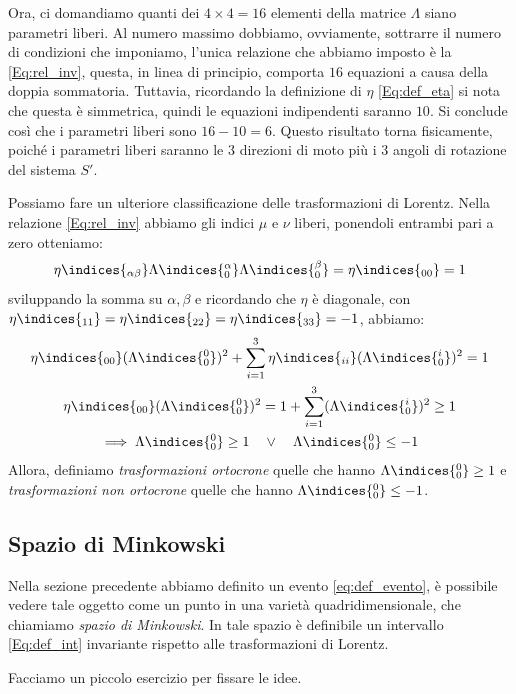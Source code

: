 Ora, ci domandiamo quanti dei $4\times4=16$ elementi della matrice $\Lambda$ siano parametri liberi. Al numero massimo dobbiamo, ovviamente, sottrarre il numero di condizioni che imponiamo, l'unica relazione che abbiamo imposto è la \eqref{Eq:rel_inv}, questa, in linea di principio, comporta $16$ equazioni a causa della doppia sommatoria. Tuttavia, ricordando la definizione di $\eta$ \eqref{Eq:def_eta} si nota che questa è simmetrica, quindi le equazioni indipendenti saranno $10$.
Si conclude così che i parametri liberi sono $16-10=6$. Questo risultato torna fisicamente, poiché i parametri liberi saranno le $3$ direzioni di moto più i $3$ angoli di rotazione del sistema $S'$.

Possiamo fare un ulteriore classificazione delle trasformazioni di Lorentz. Nella relazione \eqref{Eq:rel_inv} abbiamo gli indici $\mu$ e $\nu$ liberi, ponendoli entrambi pari a zero otteniamo:
\begin{equation*}
\eta\indices{_{\alpha \beta}}\Lambda\indices{^\alpha_0}\Lambda\indices{^\beta_0}=\eta\indices{_{00}}=1
\end{equation*}
sviluppando la somma su $\alpha,\beta$ e ricordando che $\eta$ è diagonale, con $\eta\indices{_{11}}=\eta\indices{_{22}}=\eta\indices{_{33}}=-1$, abbiamo:
\begin{gather*}
   \eta\indices{_{00}}(\Lambda\indices{^0_0})^2+\sum_{i=1}^{3}\eta\indices{_{ii}}(\Lambda\indices{^i_0})^2=1   \\
\eta\indices{_{00}}(\Lambda\indices{^0_0})^2=1 +\sum_{i=1}^{3}(\Lambda\indices{^i_0})^2\geq 1 \\
\implies \Lambda\indices{^0_0}\geq 1 \quad \vee   \quad\Lambda\indices{^0_0}\leq -1
\end{gather*}
Allora, definiamo \textit{trasformazioni ortocrone} quelle che hanno $\Lambda\indices{^0_0}\geq 1$ e \textit{trasformazioni non ortocrone} quelle che hanno $\Lambda\indices{^0_0}\leq -1$.


\subsection{Spazio di Minkowski}\label{sec:1.2}
Nella sezione precedente abbiamo definito un evento \eqref{eq:def_evento}, è possibile vedere tale oggetto come un punto in una varietà quadridimensionale, che chiamiamo \textit{spazio di Minkowski}. In tale spazio è definibile un intervallo \eqref{Eq:def_int} invariante rispetto alle trasformazioni di Lorentz.

Facciamo un piccolo esercizio per fissare le idee.

